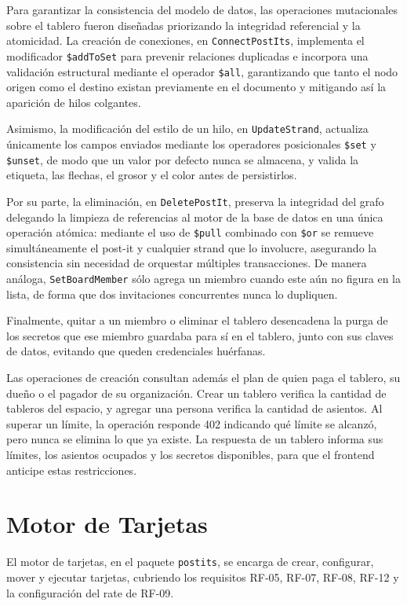Para garantizar la consistencia del modelo de datos, las operaciones mutacionales sobre el tablero fueron diseñadas priorizando la integridad referencial y la atomicidad. La creación de conexiones, en \texttt{ConnectPostIts}, implementa el modificador \texttt{\$addToSet} para prevenir relaciones duplicadas e incorpora una validación estructural mediante el operador \texttt{\$all}, garantizando que tanto el nodo origen como el destino existan previamente en el documento y mitigando así la aparición de hilos colgantes.

Asimismo, la modificación del estilo de un hilo, en \texttt{UpdateStrand}, actualiza únicamente los campos enviados mediante los operadores posicionales \texttt{\$set} y \texttt{\$unset}, de modo que un valor por defecto nunca se almacena, y valida la etiqueta, las flechas, el grosor y el color antes de persistirlos.

Por su parte, la eliminación, en \texttt{DeletePostIt}, preserva la integridad del grafo delegando la limpieza de referencias al motor de la base de datos en una única operación atómica: mediante el uso de \texttt{\$pull} combinado con \texttt{\$or} se remueve simultáneamente el post-it y cualquier strand que lo involucre, asegurando la consistencia sin necesidad de orquestar múltiples transacciones. De manera análoga, \texttt{SetBoardMember} sólo agrega un miembro cuando este aún no figura en la lista, de forma que dos invitaciones concurrentes nunca lo dupliquen.

Finalmente, quitar a un miembro o eliminar el tablero desencadena la purga de los secretos que ese miembro guardaba para sí en el tablero, junto con sus claves de datos, evitando que queden credenciales huérfanas.

Las operaciones de creación consultan además el plan de quien paga el tablero, su dueño o el pagador de su organización. Crear un tablero verifica la cantidad de tableros del espacio, y agregar una persona verifica la cantidad de asientos. Al superar un límite, la operación responde 402 indicando qué límite se alcanzó, pero nunca se elimina lo que ya existe. La respuesta de un tablero informa sus límites, los asientos ocupados y los secretos disponibles, para que el frontend anticipe estas restricciones.

\section{Motor de Tarjetas}
El motor de tarjetas, en el paquete \texttt{postits}, se encarga de crear, configurar, mover y ejecutar tarjetas, cubriendo los requisitos RF-05, RF-07, RF-08, RF-12 y la configuración del rate de RF-09.

